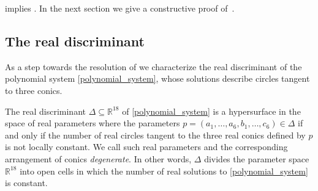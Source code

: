 \documentclass[12pt]{amsart}
\theoremstyle{definition}
\theoremstyle{definition}
\numberwithin{equation}{section}
\newcommand{\RR}{\mathbb{R}}
\begin{document}
 implies . In the next section we give a constructive proof of~.

\subsection{The real discriminant}
As a step towards the resolution of  we characterize the real discriminant of the polynomial system \eqref{polynomial_system}, whose solutions describe circles tangent to three conics.

The real discriminant $\Delta \subseteq \RR^{18}$ of \eqref{polynomial_system} is a hypersurface in the space of real parameters where the parameters $p=(a_1,\ldots,a_6,b_1,\ldots,c_6) \in \Delta$ if and only if the number of real circles tangent to the three real conics defined by $p$ is not locally constant. 
We call such real parameters and the corresponding arrangement of conics \emph{degenerate}. In other words, $\Delta$ divides the parameter space  $\RR^{18}$ into open cells in which the number of real solutions to \eqref{polynomial_system} is constant. 
\end{document}
